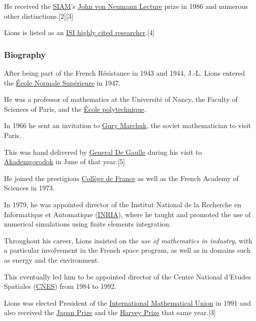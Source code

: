 \documentclass{article}
\begin{document}
He received the \href{https://en.wikipedia.org/wiki/Society_for_Industrial_and_Applied_Mathematics}{SIAM}'s \href{https://en.wikipedia.org/wiki/John_von_Neumann_Lecture}{John von Neumann Lecture} prize in 1986 and numerous other distinctions.[2][3]

Lions is listed as an \href{https://en.wikipedia.org/wiki/ISI_highly_cited_researcher}{ISI highly cited researcher}.[4] 

\subsubsection{Biography}
After being part of the French Résistance in 1943 and 1944, J.-L. Lions entered the \href{https://en.wikipedia.org/wiki/%C3%89cole_Normale_Sup%C3%A9rieure}{École Normale Supérieure} in 1947.

He was a professor of mathematics at the Université of Nancy, the Faculty of Sciences of Paris, and the \href{https://en.wikipedia.org/wiki/%C3%89cole_polytechnique}{École polytechnique}.

%
In 1966 he sent an invitation to \href{https://en.wikipedia.org/wiki/Gury_Marchuk}{Gury Marchuk}, the soviet mathematician to visit Paris.

This was hand delivered by \href{https://en.wikipedia.org/wiki/General_De_Gaulle}{General De Gaulle} during his visit to \href{https://en.wikipedia.org/wiki/Akademgorodok}{Akademgorodok} in June of that year.[5]

%
He joined the prestigious \href{https://en.wikipedia.org/wiki/Coll%C3%A8ge_de_France}{Collège de France} as well as the French Academy of Sciences in 1973.

In 1979, he was appointed director of the Institut National de la Recherche en Informatique et Automatique (\href{https://en.wikipedia.org/wiki/INRIA}{INRIA}), where he taught and promoted the use of numerical simulations using finite elements integration.

Throughout his career, Lions insisted on the \textit{use of mathematics in industry}, with a particular involvement in the French space program, as well as in domains such as energy and the environment.

This eventually led him to be appointed director of the Centre National d'Etudes Spatiales (\href{https://en.wikipedia.org/wiki/CNES}{CNES}) from 1984 to 1992.

%
Lions was elected President of the \href{https://en.wikipedia.org/wiki/International_Mathematical_Union}{International Mathematical Union} in 1991 and also received the \href{https://en.wikipedia.org/wiki/Japan_Prize}{Japan Prize} and the \href{https://en.wikipedia.org/wiki/Harvey_Prize}{Harvey Prize} that same year.[3]
\end{document}
